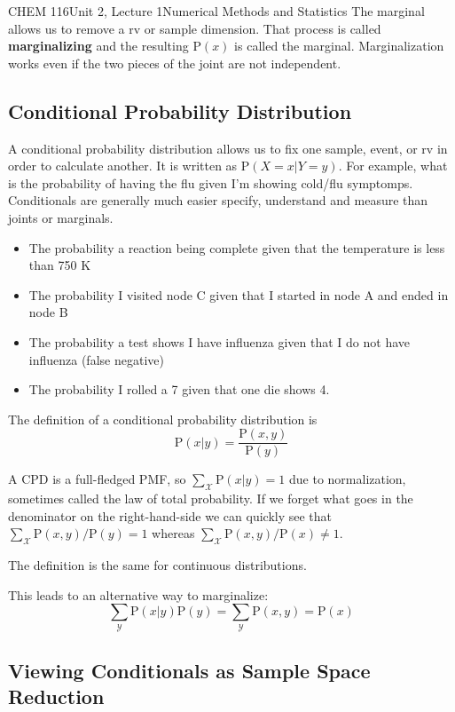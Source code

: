 \documentclass{article}
\renewcommand{\Pr}{\textrm{P}}
\begin{document}
\begin{tdoc}{CHEM 116}{Unit 2, Lecture 1}{Numerical Methods and Statistics}
The marginal allows us to remove a rv or sample dimension. That
process is called {\bf marginalizing} and the resulting $\Pr(x)$ is
called the marginal. Marginalization works even if the two pieces of
the joint are not independent. 

\subsection{Conditional Probability Distribution}
A conditional probability distribution allows us to fix one sample,
event, or rv in order to calculate another. It is written as
$\Pr(X=x|Y=y)$. For example, what is the probability of having the flu
given I'm showing cold/flu symptomps. Conditionals are generally much
easier specify, understand and measure than joints or marginals.

\begin{itemize}

\item The probability a reaction being complete given that the temperature is less than 750 K
\item The probability I visited node C given that I started in node A and ended in node B
\item The probability a test shows I have influenza given that I do not have influenza (false negative)
\item The probability I rolled a 7 given that one die shows 4. 

\end{itemize}

The definition of a conditional probability distribution is
\begin{equation}
\Pr(x|y) = \frac{\Pr(x,y)}{\Pr(y)}
\end{equation}

A CPD is a full-fledged PMF, so $\sum_\mathcal{X} \Pr(x|y) = 1$ due to
normalization, sometimes called the law of total probability.  If we
forget what goes in the denominator on the right-hand-side we can
quickly see that $\sum_\mathcal{X} \Pr(x,y) / \Pr(y) = 1$ whereas
$\sum_\mathcal{X} \Pr(x,y) / \Pr(x) \neq 1$.

The definition is the same for continuous distributions.

This leads to an alternative way to marginalize:
\[
\sum_\mathcal{Y} \Pr(x|y) \Pr(y) = \sum_\mathcal{Y} \Pr(x,y) = \Pr(x)
\]


\subsection{Viewing Conditionals as Sample Space Reduction}


\end{tdoc}
\end{document}
